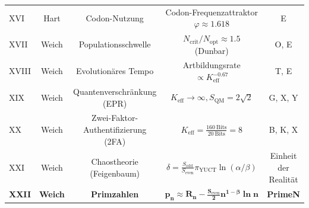\documentclass[12pt,a4paper]{article}
\begin{document}
\begin{table}[htbp]
\begin{tabular}{l c c c c}
			XVI & Hart & Codon-Nutzung & Codon-Frequenzattraktor \(\varphi \approx 1.618\) & E \\
			XVII& Weich & Populationsschwelle & \(N_{\mathrm{crit}}/N_{\mathrm{opt}} \approx 1.5\) (Dunbar) & O, E \\
			XVIII&Weich & Evolutionäres Tempo & Artbildungsrate \(\propto K_{\mathrm{eff}}^{-0.67}\) & T, E \\
			XIX & Weich & Quantenverschränkung (EPR) & \(K_{\mathrm{eff}} \to \infty, S_{\mathrm{QM}} = 2\sqrt{2}\) & G, X, Y \\
			XX  & Weich & Zwei-Faktor-Authentifizierung (2FA) & \(K_{\mathrm{eff}} = \frac{160\ \text{Bits}}{20\ \text{Bits}} = 8\) & B, K, X \\
			XXI & Weich & Chaostheorie (Feigenbaum) & \(\delta = \frac{S_{\mathrm{odd}}}{S_{\mathrm{even}}} \pi_{\mathrm{YUCT}} \ln(\alpha/\beta)\) & Einheit der Realität \\
			\textbf{XXII} & \textbf{Weich} & \textbf{Primzahlen} & \(\mathbf{p_n \approx R_n - \frac{S_{\mathrm{even}}}{2}n^{1-\beta}\ln n}\) & \textbf{PrimeN} \\
			\bottomrule
		\end{tabular}
	\end{table}
	
\end{document}
